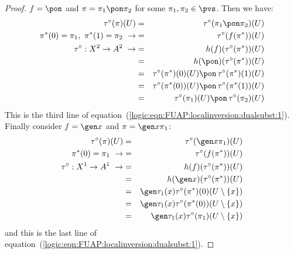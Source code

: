 \begin{proof}
$f=\pon$ and $\pi=\pi_{1}\pon\pi_{2}$ for some
$\pi_{1},\pi_{2}\in\pvs$. Then we have:
    \begin{eqnarray*}
    \tau^{\circ}(\pi)(U)&=&\tau^{\circ}(\pi_{1}\pon\pi_{2})(U)\\
    \pi^{*}(0)=\pi_{1},\ \pi^{*}(1)=\pi_{2}\ \rightarrow
    &=&\tau^{\circ}(f(\pi^{*}))(U)\\
    \tau^{\circ}:X^{2}\to A^{2}\ \rightarrow
    &=&h(f)(\tau^{\circ}(\pi^{*}))(U)\\
    &=&h(\pon)(\tau^{\circ}(\pi^{*}))(U)\\
    &=&\tau^{\circ}(\pi^{*})(0)(U)\pon\,\tau^{\circ}(\pi^{*})(1)(U)\\
    &=&\tau^{\circ}(\pi^{*}(0))(U)\pon\,\tau^{\circ}(\pi^{*}(1))(U)\\
    &=&\tau^{\circ}(\pi_{1})(U)\pon\,\tau^{\circ}(\pi_{2})(U)\\
    \end{eqnarray*}
This is the third line of
equation~(\ref{logic:eqn:FUAP:localinversion:dualsubst:1}). Finally
consider $f=\gen x$ and $\pi=\gen x\pi_{1}$:
    \begin{eqnarray*}
    \tau^{\circ}(\pi)(U)
    &=&\tau^{\circ}(\gen x\pi_{1})(U)\\
    \pi^{*}(0)=\pi_{1}\ \rightarrow
    &=&\tau^{\circ}(f(\pi^{*}))(U)\\
    \tau^{\circ}:X^{1}\to A^{1}\ \rightarrow
    &=&h(f)(\tau^{\circ}(\pi^{*}))(U)\\
    &=&h(\gen x)(\tau^{\circ}(\pi^{*}))(U)\\
    &=&\gen\tau_{1}(x)\tau^{\circ}(\pi^{*})(0)(U\setminus\{x\})\\
    &=&\gen\tau_{1}(x)\tau^{\circ}(\pi^{*}(0))(U\setminus\{x\})\\
    &=&\gen\tau_{1}(x)\tau^{\circ}(\pi_{1})(U\setminus\{x\})\\
    \end{eqnarray*}
and this is the last line of
equation~(\ref{logic:eqn:FUAP:localinversion:dualsubst:1}).
\end{proof}

